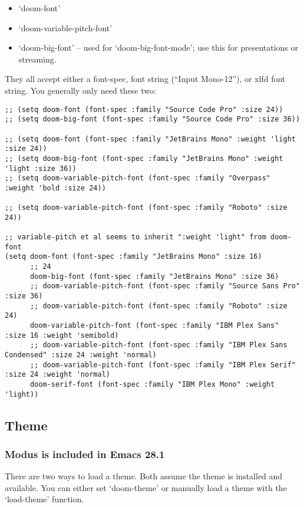 \documentclass[8pt]{article}
\begin{document}
\begin{itemize}
\item `doom-font'
\item `doom-variable-pitch-font'
\item `doom-big-font' -- used for `doom-big-font-mode'; use this for
presentations or streaming.
\end{itemize}

They all accept either a font-spec, font string (``Input Mono-12''), or xlfd
font string. You generally only need these two:
\begin{verbatim}
;; (setq doom-font (font-spec :family "Source Code Pro" :size 24))
;; (setq doom-big-font (font-spec :family "Source Code Pro" :size 36))

;; (setq doom-font (font-spec :family "JetBrains Mono" :weight 'light :size 24))
;; (setq doom-big-font (font-spec :family "JetBrains Mono" :weight 'light :size 36))
;; (setq doom-variable-pitch-font (font-spec :family "Overpass" :weight 'bold :size 24))

;; (setq doom-variable-pitch-font (font-spec :family "Roboto" :size 24))

;; variable-pitch et al seems to inherit ":weight 'light" from doom-font
(setq doom-font (font-spec :family "JetBrains Mono" :size 16)
      ;; 24
      doom-big-font (font-spec :family "JetBrains Mono" :size 36)
      ;; doom-variable-pitch-font (font-spec :family "Source Sans Pro" :size 36)
      ;; doom-variable-pitch-font (font-spec :family "Roboto" :size 24)
      doom-variable-pitch-font (font-spec :family "IBM Plex Sans" :size 16 :weight 'semibold)
      ;; doom-variable-pitch-font (font-spec :family "IBM Plex Sans Condensed" :size 24 :weight 'normal)
      ;; doom-variable-pitch-font (font-spec :family "IBM Plex Serif" :size 24 :weight 'normal)
      doom-serif-font (font-spec :family "IBM Plex Mono" :weight 'light))
\end{verbatim}

\subsection{Theme}
\label{sec:orgef331e2}
\subsubsection{Modus is included in Emacs 28.1}
\label{sec:orgb207baf}
There are two ways to load a theme. Both assume the theme is installed and
available. You can either set `doom-theme' or manually load a theme with the
`load-theme' function.
\end{document}
